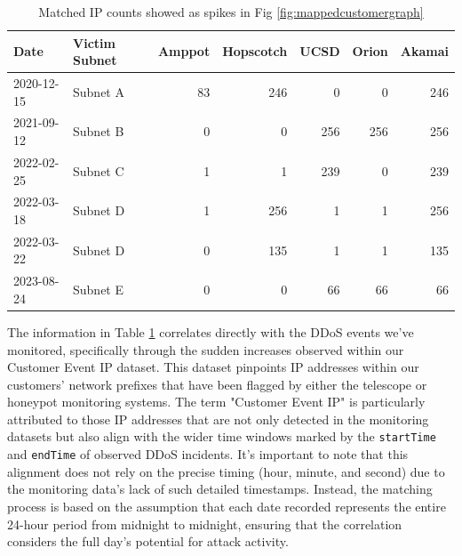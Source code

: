 \begin{table}[htbp]
    \centering
    \caption{Matched IP counts showed as spikes in Fig \ref{fig:mappedcustomergraph}}
    \begin{tabular}{|l|l|r|r|r|r|r|}
    \hline
    \textbf{Date} & \textbf{Victim Subnet} & \textbf{Amppot} & \textbf{Hopscotch} & \textbf{UCSD} & \textbf{Orion} & \textbf{Akamai} \\
    \hline
    2020-12-15 & Subnet A & 83 & 246 & 0 & 0 & 246 \\
    2021-09-12 & Subnet B & 0 & 0 & 256 & 256 & 256 \\
    2022-02-25 & Subnet C & 1 & 1 & 239 & 0 & 239 \\
    2022-03-18 & Subnet D & 1 & 256 & 1 & 1 & 256 \\
    2022-03-22 & Subnet D & 0 & 135 & 1 & 1 & 135 \\
    2023-08-24 & Subnet E & 0 & 0 & 66 & 66 & 66 \\
    \hline
    \end{tabular}
    \label{table:spikes_data}
    \end{table}


The information in Table \ref{table:spikes_data} correlates directly with the DDoS events we've monitored, specifically through the sudden increases observed within our Customer Event IP dataset. This dataset pinpoints IP addresses within our customers' network prefixes that have been flagged by either the telescope or honeypot monitoring systems. The term "Customer Event IP" is particularly attributed to those IP addresses that are not only detected in the monitoring datasets but also align with the wider time windows marked by the \texttt{startTime} and \texttt{endTime} of observed DDoS incidents. It's important to note that this alignment does not rely on the precise timing (hour, minute, and second) due to the monitoring data's lack of such detailed timestamps. Instead, the matching process is based on the assumption that each date recorded represents the entire 24-hour period from midnight to midnight, ensuring that the correlation considers the full day's potential for attack activity.


